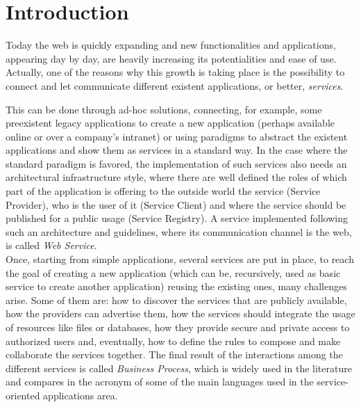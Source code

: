 \section{Introduction}
Today the web is quickly expanding and new functionalities and applications, appearing day by day, are heavily increasing its potentialities and ease of use. Actually, one of the reasons why this growth is taking place is the possibility to connect and let communicate different existent applications, or better, \textit{services}.

This can be done through ad-hoc solutions, connecting, for example, some preexistent legacy applications to create a new application (perhaps available online or over a company's intranet) or using paradigms to abstract the existent applications and show them as services in a standard way. %
In the case where the standard paradigm is favored, the implementation of such services also needs an architectural infrastructure style, where there are well defined the roles of which part of the application is offering to the outside world the service (Service Provider), who is the user of it (Service Client) and where the service should be published for a public usage (Service Registry). %
A service implemented following such an architecture and guidelines, where its communication channel is the web, is called \textit{Web Service}.\\ %

Once, starting from simple applications, several services are put in place, to reach the goal of creating a new application (which can be, recursively, used as basic service to create another application) reusing the existing ones, many challenges arise. Some of them are: how to discover the services that are publicly available, how the providers can advertise them, how the services should integrate the usage of resources like files or databases, how they provide secure and private access to authorized users and, eventually, how to define the rules to compose and make collaborate the services together. 
The final result of the interactions among the different services is called \textit{Business Process}, which is widely used in the literature and compares in the acronym of some of the main languages used in the service-oriented applications area.\\

